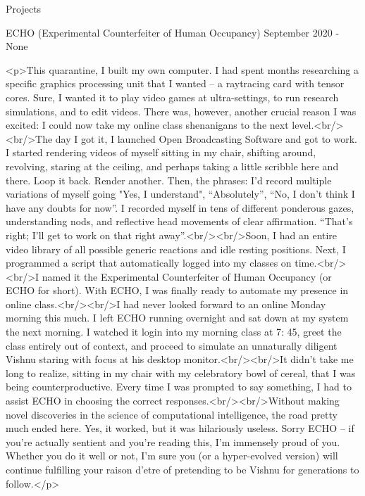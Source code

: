 \documentclass{resume} %
\begin{document}
\begin{rSection}{Projects}
\begin{rSubsection}{ ECHO (Experimental Counterfeiter of Human Occupancy) }{ September 2020 - None }{}
\item <p>\n            This quarantine, I built my own computer. I had spent months researching a specific graphics processing unit that I wanted – a raytracing card with tensor cores. Sure, I wanted it to play video games at ultra-settings, to run research simulations, and to edit videos. There was, however, another crucial reason I was excited: I could now take my online class shenanigans to the next level.<br/><br/>\n            The day I got it, I launched Open Broadcasting Software and got to work. I started rendering videos of myself sitting in my chair, shifting around, revolving, staring at the ceiling, and perhaps taking a little scribble here and there. Loop it back. Render another. Then, the phrases: I'd record multiple variations of myself going "Yes, I understand", “Absolutely”, “No, I don’t think I have any doubts for now”. I recorded myself in tens of different ponderous gazes, understanding nods, and reflective head movements of clear affirmation. “That’s right; I’ll get to work on that right away”.<br/><br/>\n            Soon, I had an entire video library of all possible generic reactions and idle resting positions. Next, I programmed a script that automatically logged into my classes on time.<br/><br/>\n            I named it the Experimental Counterfeiter of Human Occupancy (or ECHO for short). With ECHO, I was finally ready to automate my presence in online class.<br/><br/>\n            I had never looked forward to an online Monday morning this much. I left ECHO running overnight and sat down at my system the next morning. I watched it login into my morning class at 7: 45, greet the class entirely out of context, and proceed to simulate an unnaturally diligent Vishnu staring with focus at his desktop monitor.<br/><br/>\n            It didn’t take me long to realize, sitting in my chair with my celebratory bowl of cereal, that I was being counterproductive. Every time I was prompted to say something, I had to assist ECHO in choosing the correct responses.<br/><br/>\n            Without making novel discoveries in the science of computational intelligence, the road pretty much ended here. Yes, it worked, but it was hilariously useless. Sorry ECHO – if you’re actually sentient and you’re reading this, I’m immensely proud of you. Whether you do it well or not, I’m sure you (or a hyper-evolved version) will continue fulfilling your raison d'etre of pretending to be Vishnu for generations to follow.\n\n        </p>


\end{rSubsection}
\end{rSection}
\end{document}
